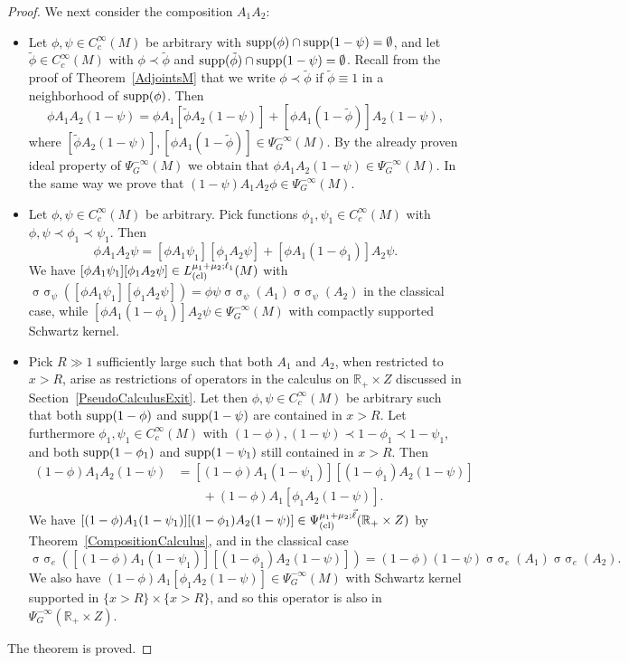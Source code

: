 \documentclass[reqno]{amsart}
\numberwithin{equation}{section}
\theoremstyle{definition}
\def\R{\mathbb R}
\DeclareMathOperator{\sym}{ \sigma\!\!\!\sigma}
\begin{document}
\begin{proof}
We next consider the composition $A_1A_2$:
\begin{itemize}
\item Let $\phi,\psi \in C_c^{\infty}(M)$ be arbitrary with $\textup{supp}(\phi)\cap\textup{supp}(1-\psi) = \emptyset$, and let $\tilde{\phi} \in C_c^{\infty}(M)$ with $\phi \prec \tilde{\phi}$ and $\textup{supp}(\tilde{\phi})\cap\textup{supp}(1-\psi) = \emptyset$. Recall from the proof of Theorem~\ref{AdjointsM} that we write $\phi \prec \tilde{\phi}$ if $\tilde{\phi} \equiv 1$ in a neighborhood of $\textup{supp}(\phi)$. Then
$$
\phi A_1A_2 (1-\psi) = \phi A_1 [\tilde{\phi} A_2 (1-\psi)] + [\phi A_1 (1-\tilde{\phi})] A_2(1-\psi),
$$
where $[\tilde{\phi} A_2 (1-\psi)], [\phi A_1 (1-\tilde{\phi})] \in \Psi^{-\infty}_G(M)$. By the already proven ideal property of $\Psi^{-\infty}_G(M)$ we obtain that $\phi A_1A_2 (1-\psi) \in \Psi^{-\infty}_G(M)$. In the same way we prove that $(1-\psi)A_1A_2\phi \in \Psi^{-\infty}_G(M)$.
\item Let $\phi,\psi \in C_c^{\infty}(M)$ be arbitrary. Pick functions $\phi_1,\psi_1 \in C_c^{\infty}(M)$ with $\phi,\psi \prec \phi_1 \prec \psi_1$. Then
$$
\phi A_1 A_2 \psi = [\phi A_1 \psi_1][\phi_1 A_2 \psi] + [\phi A_1 (1-\phi_1)]A_2\psi.
$$
We have $[\phi A_1 \psi_1][\phi_1 A_2 \psi] \in L^{\mu_1+\mu_2;\ell_1}_{\textup{(cl)}}(M)$ with $\sym_{\psi}([\phi A_1 \psi_1][\phi_1 A_2 \psi]) = \phi\psi \sym_{\psi}(A_1)\sym_{\psi}(A_2)$ in the classical case, while $[\phi A_1 (1-\phi_1)]A_2\psi \in \Psi^{-\infty}_G(M)$ with compactly supported Schwartz kernel.
\item Pick $R \gg 1$ sufficiently large such that both $A_1$ and $A_2$, when restricted to $x > R$, arise as restrictions of operators in the calculus on $\R_+\times Z$ discussed in Section~\ref{PseudoCalculusExit}. Let then $\phi,\psi \in C_c^{\infty}(M)$ be arbitrary such that both $\textup{supp}(1-\phi)$ and $\textup{supp}(1-\psi)$ are contained in $x > R$. Let furthermore $\phi_1,\psi_1 \in C_c^{\infty}(M)$ with $(1-\phi),(1-\psi) \prec 1 - \phi_1 \prec 1 - \psi_1$, and both $\textup{supp}(1-\phi_1)$ and $\textup{supp}(1-\psi_1)$ still contained in $x > R$. Then
\begin{align*}
(1-\phi)A_1A_2(1-\psi) &= [(1-\phi)A_1(1-\psi_1)][(1-\phi_1)A_2(1-\psi)] \\
&\qquad + (1-\phi)A_1 [\phi_1A_2(1-\psi)].
\end{align*}
We have $[(1-\phi)A_1(1-\psi_1)][(1-\phi_1)A_2(1-\psi)] \in \Psi^{\mu_1+\mu_2;\vec{\ell}}_{\textup{(cl)}}(\R_+\times Z)$ by Theorem~\ref{CompositionCalculus}, and in the classical case
$$
\sym_e([(1-\phi)A_1(1-\psi_1)][(1-\phi_1)A_2(1-\psi)]) = (1-\phi)(1-\psi)\sym_e(A_1)\sym_e(A_2).
$$
We also have $(1-\phi)A_1 [\phi_1A_2(1-\psi)] \in \Psi^{-\infty}_G(M)$ with Schwartz kernel supported in $\{x > R\}\times \{x > R\}$, and so this operator is also in $\Psi^{-\infty}_G(\R_+\times Z)$.
\end{itemize}
The theorem is proved.
\end{proof}
\end{document}
